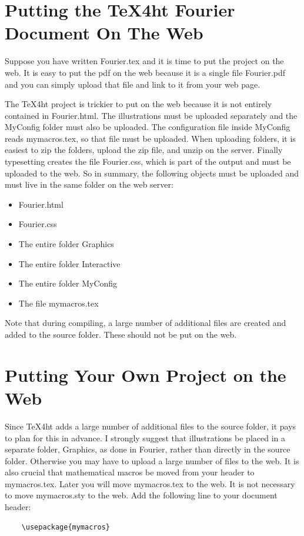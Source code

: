 \documentclass[11pt, oneside]{article}   	%
\begin{document}
\section{Putting the TeX4ht Fourier Document On The Web}

Suppose you have written Fourier.tex and it is time to put the project on the web. It is
easy to put the pdf on the web because it is a single file Fourier.pdf and you can simply
upload that file and link to it from your web page. 

The TeX4ht project is  trickier to put on the web because it is not entirely contained
in Fourier.html. The illustrations must be uploaded separately and the MyConfig folder must also be uploaded. The configuration file inside MyConfig reads mymacros.tex, so that file must be uploaded. When uploading folders, it is easiest to zip the folders, upload the zip
file, and unzip on the server. Finally typesetting creates the file Fourier.css, which is part
of the output and must be uploaded to the web. So in summary, the following objects must
be uploaded and must live in the same folder on the web server:
\begin{itemize}
\item Fourier.html
\item Fourier.css
\item The entire folder Graphics
\item The entire folder Interactive
\item The entire folder MyConfig
\item The file mymacros.tex
\end{itemize}

Note that during compiling, a large number of additional files are created and added to the
source folder. These should not be put on the web.

\newpage
\section{Putting Your Own Project on the Web}

Since TeX4ht  adds a large number of additional files to the source folder,  it pays
to plan for this in advance.  I strongly suggest that illustrations be placed in a separate folder, Graphics,
as done in Fourier, rather than directly in the source folder. Otherwise you may have to upload a large number of files to the web. It is also crucial that mathematical macros be moved from your header
to mymacros.tex. Later you will move mymacros.tex to the web. It is not necessary to move
mymacros.sty to the web. Add the following line to your document header:
\begin{verbatim}
    \usepackage{mymacros} 
\end{verbatim}
\end{document}
